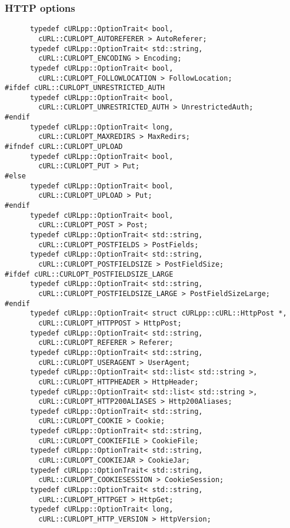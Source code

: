 \documentclass{article}
\begin{document}
\subsubsection{HTTP options}
\begin{verbatim}
      typedef cURLpp::OptionTrait< bool, 
        cURL::CURLOPT_AUTOREFERER > AutoReferer;
      typedef cURLpp::OptionTrait< std::string, 
        cURL::CURLOPT_ENCODING > Encoding;
      typedef cURLpp::OptionTrait< bool, 
        cURL::CURLOPT_FOLLOWLOCATION > FollowLocation;
#ifdef cURL::CURLOPT_UNRESTRICTED_AUTH
      typedef cURLpp::OptionTrait< bool, 
        cURL::CURLOPT_UNRESTRICTED_AUTH > UnrestrictedAuth;
#endif
      typedef cURLpp::OptionTrait< long, 
        cURL::CURLOPT_MAXREDIRS > MaxRedirs;
#ifndef cURL::CURLOPT_UPLOAD
      typedef cURLpp::OptionTrait< bool, 
        cURL::CURLOPT_PUT > Put;
#else
      typedef cURLpp::OptionTrait< bool, 
        cURL::CURLOPT_UPLOAD > Put;
#endif
      typedef cURLpp::OptionTrait< bool, 
        cURL::CURLOPT_POST > Post;
      typedef cURLpp::OptionTrait< std::string, 
        cURL::CURLOPT_POSTFIELDS > PostFields;
      typedef cURLpp::OptionTrait< std::string, 
        cURL::CURLOPT_POSTFIELDSIZE > PostFieldSize;
#ifdef cURL::CURLOPT_POSTFIELDSIZE_LARGE
      typedef cURLpp::OptionTrait< std::string, 
        cURL::CURLOPT_POSTFIELDSIZE_LARGE > PostFieldSizeLarge;
#endif
      typedef cURLpp::OptionTrait< struct cURLpp::cURL::HttpPost *, 
        cURL::CURLOPT_HTTPPOST > HttpPost;
      typedef cURLpp::OptionTrait< std::string, 
        cURL::CURLOPT_REFERER > Referer;
      typedef cURLpp::OptionTrait< std::string, 
        cURL::CURLOPT_USERAGENT > UserAgent;
      typedef cURLpp::OptionTrait< std::list< std::string >, 
        cURL::CURLOPT_HTTPHEADER > HttpHeader;
      typedef cURLpp::OptionTrait< std::list< std::string >, 
        cURL::CURLOPT_HTTP200ALIASES > Http200Aliases;
      typedef cURLpp::OptionTrait< std::string, 
        cURL::CURLOPT_COOKIE > Cookie;
      typedef cURLpp::OptionTrait< std::string, 
        cURL::CURLOPT_COOKIEFILE > CookieFile;
      typedef cURLpp::OptionTrait< std::string, 
        cURL::CURLOPT_COOKIEJAR > CookieJar;
      typedef cURLpp::OptionTrait< std::string, 
        cURL::CURLOPT_COOKIESESSION > CookieSession;
      typedef cURLpp::OptionTrait< std::string, 
        cURL::CURLOPT_HTTPGET > HttpGet;
      typedef cURLpp::OptionTrait< long, 
        cURL::CURLOPT_HTTP_VERSION > HttpVersion;
\end{verbatim}
\end{document}
